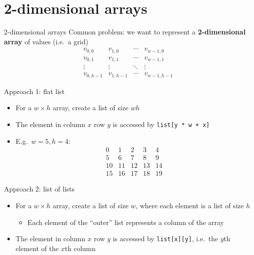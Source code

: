 \part{2-dimensional arrays}
\frame{\partpage}

\begin{frame}{2-dimensional arrays}
	\pause Common problem: we want to represent a \textbf{2-dimensional array} of values (i.e.\ a grid)
	\pause
	$$
		\begin{matrix}
			v_{0,0} & v_{1,0} & \cdots & v_{w-1,0} \\
			v_{0,1} & v_{1,1} & \cdots & v_{w-1,1} \\
			\vdots  & \vdots  & \ddots & \vdots  \\
			v_{0,h-1} & v_{1,h-1} & \cdots & v_{w-1,h-1}
		\end{matrix}
	$$
\end{frame}

\begin{frame}{Approach 1: flat list}
	\begin{itemize}
		\pause\item For a $w \times h$ array, create a list of size $wh$
		\pause\item The element in column $x$ row $y$ is accessed by \lstinline{list[y * w + x]}
		\pause\item E.g.\ $w=5, h=4$:
		$$
			\begin{matrix}
				0 & 1 & 2 & 3 & 4 \\
				5 & 6 & 7 & 8 & 9 \\
				10 & 11 & 12 & 13 & 14 \\
				15 & 16 & 17 & 18 & 19
			\end{matrix}
		$$
	\end{itemize}
\end{frame}

\begin{frame}{Approach 2: list of lists}
	\begin{itemize}
		\pause\item For a $w \times h$ array, create a list of size $w$, where each element is a list of size $h$
			\begin{itemize}
				\pause\item Each element of the ``outer'' list represents a column of the array
			\end{itemize}
		\pause\item The element in column $x$ row $y$ is accessed by \lstinline{list[x][y]},
			i.e.\ the $y$th element of the $x$th column
	\end{itemize}
\end{frame}

